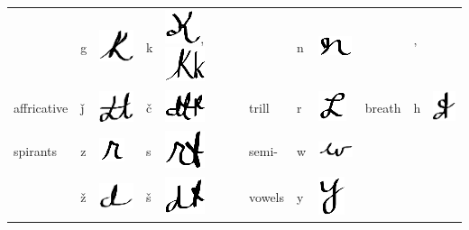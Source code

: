 \documentclass[output=paper]{LSP/langsci}
\begin{document}
\begin{table}
\begin{tabular}{lllllllllll}
& g & \includegraphics{figures/Danker4g} & k & \includegraphics{figures/Danker4k1}, \includegraphics{figures/Danker4k2} && n & \includegraphics{figures/Danker4n} && ' \\
affricative & ǰ & \includegraphics{figures/Danker4j} & č & \includegraphics{figures/Danker4ch} & trill & r & \includegraphics{figures/Danker4r} & breath & h & \includegraphics{figures/Danker4h}\\
spirants & z & \includegraphics{figures/Danker4z} & s & \includegraphics{figures/Danker4s} & semi- & w & \includegraphics{figures/Danker4w}\\
& ž & \includegraphics{figures/Danker4zh} & š & \includegraphics{figures/Danker4sh} & vowels & y & \includegraphics{figures/Danker4y}\\

\end{tabular}
\end{table}
\end{document}
